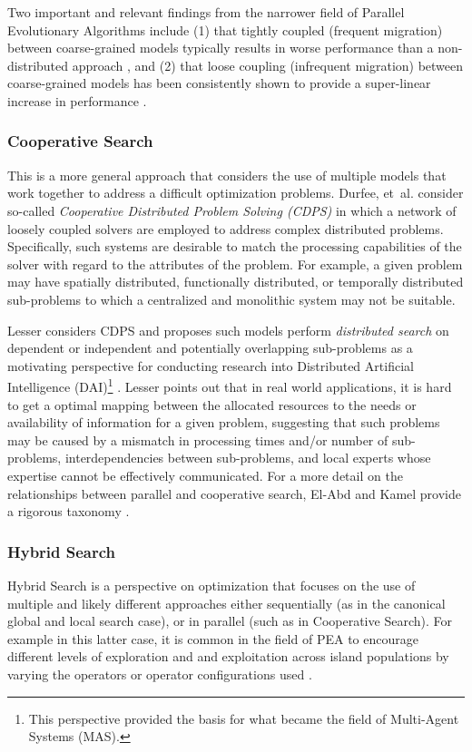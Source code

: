 \documentclass[a4paper, 11pt]{article}
\begin{document}
Two important and relevant findings from the narrower field of Parallel Evolutionary Algorithms include (1) that tightly coupled (frequent migration) between coarse-grained models typically results in worse performance than a non-distributed approach \cite{Alba2000}, and (2) that loose coupling (infrequent migration) between coarse-grained models has been consistently shown to provide a super-linear increase in performance \cite{Alba2002a, Belding1995, Cantu-Paz2000}.
	
\subsubsection{Cooperative Search}
This is a more general approach that considers the use of multiple models that work together to address a difficult optimization problems. Durfee, et~al. consider so-called \emph{Cooperative Distributed Problem Solving (CDPS)} in which a network of loosely coupled solvers are employed to address complex distributed problems. Specifically, such systems are desirable to match the processing capabilities of the solver with regard to the attributes of the problem. For example, a given problem may have spatially distributed, functionally distributed, or temporally distributed sub-problems to which a centralized and monolithic system may not be suitable. 

Lesser considers CDPS and proposes such models perform \emph{distributed search} on dependent or independent and potentially overlapping sub-problems as a motivating perspective for conducting research into Distributed Artificial Intelligence (DAI)\footnote{This perspective provided the basis for what became the field of Multi-Agent Systems (MAS).} \cite{Lesser1990}. Lesser points out that in real world applications, it is hard to get a optimal mapping between the allocated resources to the needs or availability of information for a given problem, suggesting that such problems may be caused by a mismatch in processing times and/or number of sub-problems, interdependencies between sub-problems, and local experts whose expertise cannot be effectively communicated. For a more detail on the relationships between parallel and cooperative search, El-Abd and Kamel provide a rigorous taxonomy \cite{El-Abd2005}.
	
\subsubsection{Hybrid Search}
Hybrid Search is a perspective on optimization that focuses on the use of multiple and likely different approaches either sequentially (as in the canonical global and local search case), or in parallel (such as in Cooperative Search). For example in this latter case, it is common in the field of PEA to encourage different levels of exploration and and exploitation across island populations by varying the operators or operator configurations used \cite{Tanese1989, Adamidis1996}. 
\end{document}
